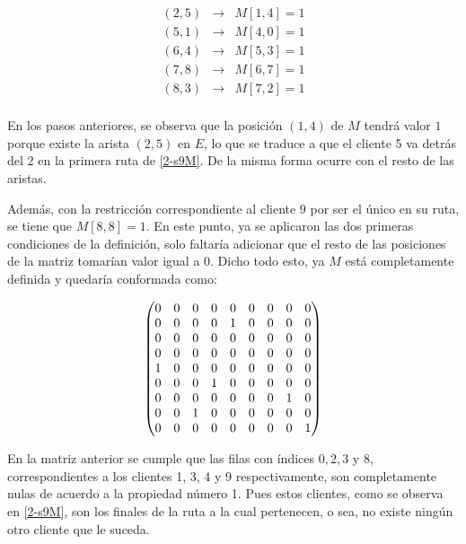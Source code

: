  \begin{eqnarray*}
 	(2, 5) & \rightarrow & M[1, 4] = 1 \\
 	(5, 1) & \rightarrow & M[4, 0] = 1 \\
 	(6, 4) & \rightarrow & M[5, 3] = 1 \\
 	(7, 8) & \rightarrow & M[6, 7] = 1 \\
 	(8, 3) & \rightarrow & M[7, 2] = 1 \\
 \end{eqnarray*}
 
 En los pasos anteriores, se observa que la posición $(1, 4)$ de $M$ tendrá valor $1$ porque existe la arista $(2, 5)$ en $E$, lo que se traduce a que el cliente 5 va detrás del 2 en la primera ruta de \ref{2-s9M}. De la misma forma ocurre con el resto de las aristas.
  
 Además, con la restricción correspondiente al cliente $9$ por ser el único en su ruta, se tiene que $M[8, 8] = 1$. En este punto, ya se aplicaron las dos primeras condiciones de la definición, solo faltaría adicionar que el resto de las posiciones de la matriz tomarían valor igual a 0. Dicho todo esto, ya $M$ está completamente definida y quedaría conformada como: 
 
 \begin{equation}
 \label{M9}
 \centering
 \begin{pmatrix}
 0 & 0 & 0 & 0 & 0 & 0 & 0 & 0 & 0\\
 0 & 0 & 0 & 0 & 1 & 0 & 0 & 0 & 0\\
 0 & 0 & 0 & 0 & 0 & 0 & 0 & 0 & 0\\
 0 & 0 & 0 & 0 & 0 & 0 & 0 & 0 & 0\\
 1 & 0 & 0 & 0 & 0 & 0 & 0 & 0 & 0\\
 0 & 0 & 0 & 1 & 0 & 0 & 0 & 0 & 0\\
 0 & 0 & 0 & 0 & 0 & 0 & 0 & 1 & 0\\
 0 & 0 & 1 & 0 & 0 & 0 & 0 & 0 & 0\\
 0 & 0 & 0 & 0 & 0 & 0 & 0 & 0 & 1\\
 \end{pmatrix}
 \end{equation}
 
 En la matriz anterior se cumple que las filas con índices $0, 2, 3$ y $8$, correspondientes a los clientes 1, 3, 4 y 9 respectivamente, son completamente nulas de acuerdo a la propiedad número 1. Pues estos clientes, como se observa en \ref{2-s9M}, son los finales de la ruta a la cual pertenecen, o sea, no existe ningún otro cliente que le suceda. 
 
